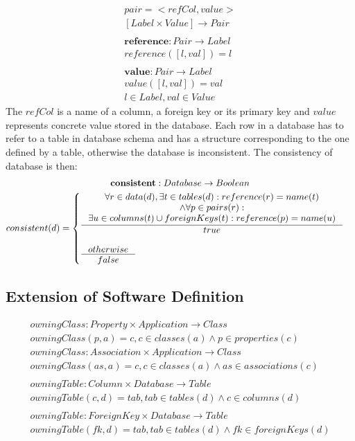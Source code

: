 \documentclass[11pt]{article}
\begin{document}
\begin{gather*}
pair = < refCol, value > \\
[Label \times Value] \rightarrow Pair\\ \\
\mathbf{reference} : Pair \rightarrow Label \\
reference([l,val]) = l \\ \\
\mathbf{value} : Pair \rightarrow Label \\ 
value([l,val]) = val \\
l \in Label, val \in Value
\end{gather*}
The $refCol$ is a name of a column, a foreign key or its primary key and $value$ represents concrete value stored in the database. Each row in a database has to refer to a table in database schema and has a structure corresponding to the one defined by a table, otherwise the database is inconsistent. The consistency of database is then:
\begin{gather*}
\mathbf{consistent} : Database \rightarrow Boolean \\
consistent(d) = \begin{cases}
 	\inference{\forall r \in data(d), \exists t \in tables(d) : reference(r) = name(t) \\ \wedge \forall p \in pairs(r) :\\ \exists u \in columns(t) \cup foreignKeys(t) : reference(p) = name(u)}{true}
 	\\ \\
 	\inference{otherwise}{false}
 \end{cases}
\end{gather*}

\subsection{Extension of Software Definition}

\begin{gather*}
 owningClass : Property \times Application \rightarrow Class  \\ owningClass(p, a) = c, c \in classes(a) \wedge p \in properties(c) \\
  owningClass : Association \times Application \rightarrow Class  \\
owningClass(as, a) = c, c \in classes(a) \wedge as \in associations(c) \\ \\
owningTable : Column \times Database \rightarrow Table  \\
owningTable(c, d) = tab, tab \in tables(d) \wedge c \in columns(d) \\ \\
owningTable : ForeignKey \times Database \rightarrow Table  \\
owningTable(fk, d) = tab, tab \in tables(d) \wedge fk \in foreignKeys(d)\\ \\ 
\end{gather*}
\end{document}
